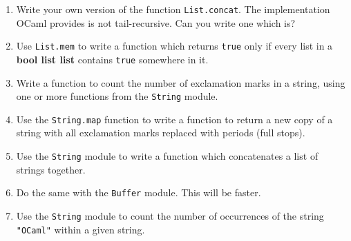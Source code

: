 \documentclass[]{book}
\begin{document}
\begin{enumerate}
  \item Write your own version of the function \texttt{List.concat}. The implementation OCaml provides is not tail-recursive. Can you write one which is?
  \item Use \texttt{List.mem} to write a function which returns \texttt{true} only if every list in a \textrm{\textbf{bool list list}} contains \texttt{true} somewhere in it.
  \item Write a function to count the number of exclamation marks in a string, using one or more functions from the \texttt{String} module.
  \item Use the \texttt{String.map} function to write a function to return a new copy of a string with all exclamation marks replaced with periods (full stops).
  \item Use the \texttt{String} module to write a function which concatenates a list of strings together.
  \item Do the same with the \texttt{Buffer} module. This will be faster.
  \item Use the \texttt{String} module to count the number of occurrences of the string \texttt{"OCaml"} within a given string.
\end{enumerate}

\cleardoublepage
\thispagestyle{empty}
\chapter*{}
\\
\end{document}
